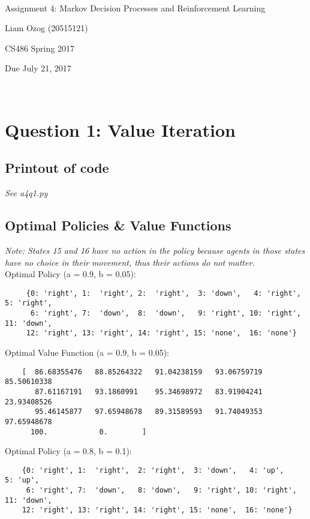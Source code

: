\documentclass{article}
\newcommand\projecttitle{Assignment 4: Markov Decision Processes and Reinforcement
Learning}
\newcommand\myname{Liam Ozog (20515121)}
\newcommand\myclass{CS486 Spring 2017}
\newcommand\mydate{Due July 21, 2017}
\begin{document}
~\vfill
\begin{center}
\Large

\projecttitle

\myname

\myclass

\mydate

\end{center}
\vfill ~\vfill~

\newpage

\section*{Question 1: Value Iteration}
\normalsize

	\subsection*{Printout of code}

	\textit{See a4q1.py}

  \subsection*{Optimal Policies \& Value Functions}
  \noindent
  \textit{Note: States 15 and 16 have no action in the policy because agents in those states have no choice in their
  movement, thus their actions do not matter.} \\

  \noindent
  Optimal Policy (a = 0.9, b = 0.05):
  \begin{verbatim}
     {0: 'right', 1:  'right', 2:  'right',  3: 'down',   4: 'right',  5: 'right',
      6: 'right', 7:  'down',  8:  'down',   9: 'right', 10: 'right', 11: 'down',
     12: 'right', 13: 'right', 14: 'right', 15: 'none',  16: 'none'}
  \end{verbatim}

  \noindent
  Optimal Value Function (a = 0.9, b = 0.05):
  \begin{verbatim}
    [  86.68355476   88.85264322   91.04238159   93.06759719   85.50610338
       87.61167191   93.1860991    95.34698972   83.91904241   23.93408526
       95.46145877   97.65948678   89.31589593   91.74049353   97.65948678
      100.            0.        ]
  \end{verbatim}

  \noindent
  Optimal Policy (a = 0.8, b = 0.1):
  \begin{verbatim}
    {0: 'right', 1:  'right',  2: 'right',  3: 'down',   4: 'up',     5: 'up',
     6: 'right', 7:  'down',   8: 'down',   9: 'right', 10: 'right', 11: 'down',
    12: 'right', 13: 'right', 14: 'right', 15: 'none',  16: 'none'}
  \end{verbatim}
\end{document}
